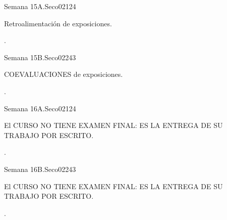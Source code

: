 \begin{syllabus}
\begin{unit}{}{Semana 15A.}{Seco02}{12}{4}
   \begin{topics}
      \item Retroalimentación de exposiciones.
   \end{topics}
   \begin{learningoutcomes}
      \item .
   \end{learningoutcomes}
\end{unit}

\begin{unit}{}{Semana 15B.}{Seco02}{24}{3}
   \begin{topics}
      \item COEVALUACIONES de exposiciones.
   \end{topics}

   \begin{learningoutcomes}
      \item .
      \end{learningoutcomes}
\end{unit}

\begin{unit}{}{Semana 16A.}{Seco02}{12}{4}
   \begin{topics}
      \item El CURSO NO TIENE EXAMEN FINAL: ES LA ENTREGA DE SU TRABAJO POR ESCRITO.
   \end{topics}
   \begin{learningoutcomes}
      \item .
   \end{learningoutcomes}
\end{unit}

\begin{unit}{}{Semana 16B.}{Seco02}{24}{3}
   \begin{topics}
      \item El CURSO NO TIENE EXAMEN FINAL: ES LA ENTREGA DE SU TRABAJO POR ESCRITO.
   \end{topics}

   \begin{learningoutcomes}
      \item .
      \end{learningoutcomes}
\end{unit}



\begin{coursebibliography}
\end{coursebibliography}

\end{syllabus}
